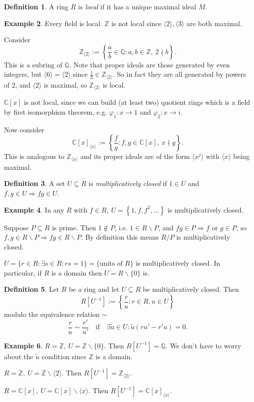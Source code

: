 \documentclass[a4paper]{article}
\theoremstyle{definition}
\newtheorem{defn}{Definition}[subsection]
\newtheorem{example}[defn]{Example}
\begin{document}
\begin{defn}
A ring $R$ is \textit{local} if it has a unique maximal ideal $M$.
\end{defn}
\begin{example}
\label{example:nonexampleLocal}
Every field is local. $\mathbb Z$ is not local since $\langle2\rangle,\langle 3\rangle$ are both maximal.

Consider
\[
\mathbb Z_{\langle 2\rangle}:=\left\{ \frac{a}{b}\in\mathbb Q:a,b\in\mathbb Z,\ 2\nmid b \right\}.
\]
This is a subring of $\mathbb Q$. Note that proper ideals are those generated by even integers, but $\langle 6\rangle=\langle 2\rangle$ since $\frac13 \in \mathbb Z_{\langle 2\rangle}$. So in fact they are all generated by powers of 2, and $\langle 2\rangle$ is maximal, so $\mathbb Z_{\langle 2\rangle}$ is local.

$\mathbb C[x]$ is not local, since we can build (at least two) quotient rings which is a field by first isomorphism theorem, e.g. $\varphi_1 :x\rightarrow 1$ and $\varphi_2 :x\rightarrow i$.

Now consider
\[
\mathbb C[x]_{\langle x\rangle}:= \left\{ \frac{f}{g}:f,g\in\mathbb C[x],\ x\nmid g \right\}.
\]
This is analogous to $\mathbb Z_{\langle x\rangle}$ and its proper ideals are of the form $\langle x^j\rangle$ with $\langle x\rangle$ being maximal.
\end{example}
\begin{defn}
A set $U\subseteq R$ is \textit{multiplicatively closed} if $1\in U$ and $f,g\in U\Rightarrow fg\in U$.
\end{defn}
\begin{example}
In any $R$ with $f\in R,\ U=\left\{1,f,f^2,\ldots\right\}$ is multiplicatively closed. 

Suppose $P\subseteq R$ is prime. Then $1\notin P$, i.e. $1\in R\backslash P$, and $fg\in P\Rightarrow f$ or $g \in P$, so $f,g\in R\backslash P\Rightarrow fg\in R\backslash P$. By definition this means $R/P$ is multiplicatively closed.

$U=\{r\in R:\exists s\in R:rs=1\}=\{\text{units of }R\}$ is multiplicatively closed. In particular, if $R$ is a domain then $U=R\backslash\{0\}$ is.
\end{example}

\begin{defn}
\label{defn:localisation}
Let $R$ be a ring and let $U\subseteq R$ be multiplicatively closed. Then
\[
R\left[U^{-1}\right]:=\left\{ \frac{r}{u}:r\in R,u\in U \right\}
\]
modulo the equivalence relation $\sim$
\[
\frac{r}{u}\sim\frac{r'}{u'} \quad\text{if}\quad \exists \widetilde u \in U : \widetilde u(ru'-r'u)=0.
\]
\end{defn}
\begin{example}
$R=\mathbb Z,\ U=\mathbb Z\backslash\{0\}$. Then $R\left[U^{-1}\right]=\mathbb Q$. We don't have to worry about the $\widetilde u$ condition since $\mathbb Z$ is a domain.

$R=\mathbb Z,\ U=\mathbb Z\backslash \langle 2\rangle$. Then $R[U^{-1}]=\mathbb Z_{\langle 2\rangle}$.

$R=\mathbb C[x],\ U=\mathbb C[x]\backslash \langle x\rangle$. Then $R[U^{-1}]=\mathbb C[x]_{\langle x\rangle}$.
\end{example}
\end{document}
